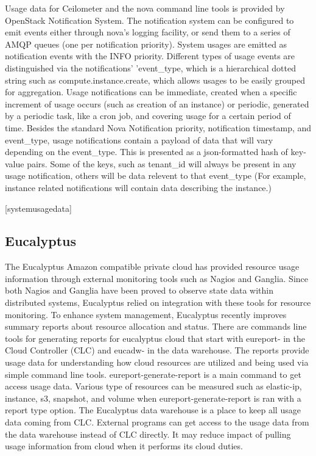 \documentclass{sig-alternate}
\begin{document}
Usage data for Ceilometer and the nova command line tools is provided by OpenStack Notification System. The notification system can be configured to emit events either through nova's logging facility, or send them to a series of AMQP queues (one per notification priority). System usages are emitted as notification events with the INFO priority. Different types of usage events are distinguished via the notifications' 'event\_type, which is a hierarchical dotted string such as compute.instance.create, which allows usages to be easily grouped for aggregation. Usage notifications can be immediate, created when a specific increment of usage occurs (such as creation of an instance) or periodic, generated by a periodic task, like a cron job, and covering usage for a certain period of time. Besides the standard Nova Notification priority, notification timestamp, and event\_type, usage notifications contain a payload of data that will vary depending on the event\_type. This is presented as a json-formatted hash of key-value pairs. Some of the keys, such as tenant\_id will always be present in any usage notification, others will be data relevent to that event\_type (For example, instance related notifications will contain data describing the instance.)

[systemusagedata]

\subsection{Eucalyptus}

The Eucalyptus Amazon compatible private cloud has provided resource usage information through external monitoring tools such as Nagios and Ganglia. Since both Nagios and Ganglia have been proved to observe state data within distributed systems, Eucalyptus relied on integration with these tools for resource monitoring. To enhance system management, Eucalyptus recently improves summary reports about resource allocation and status. There are commands line tools for generating reports for eucalyptus cloud that start with eureport- in the Cloud Controller (CLC) and eucadw- in the data warehouse. The reports provide usage data for understanding how cloud resources are utilized and being used via simple command line tools. eureport-generate-report is a main command to get access usage data. Various type of resources can be measured such as elastic-ip, instance, s3, snapshot, and volume when eureport-generate-report is ran with a report type option. The Eucalyptus data warehouse is a place to keep all usage data coming from CLC. External programs can get access to the usage data from the data warehouse instead of CLC directly. It may reduce impact of pulling usage information from cloud when it performs its cloud duties.
\end{document}
